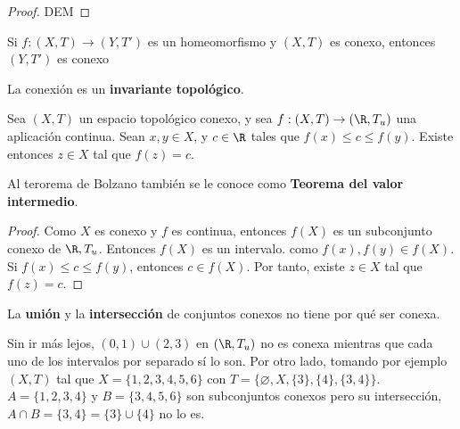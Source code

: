 \begin{proof}
    DEM
\end{proof}

\begin{ncor}
  Si $f:(X,T) \to (Y,T')$ es un homeomorfismo y $(X,T)$ es conexo, entonces $(Y,T')$ es conexo 
\end{ncor}
\begin{obs}
    La conexión es un \textbf{invariante topológico}.
\end{obs}

\begin{nth}[de Bolzano]
  Sea $(X,T)$ un espacio topológico conexo, y sea $f:(X,T) \to (\R,T_u)$ una aplicación continua. Sean $x,y \in X$, y $c \in \R$ tales que $f(x) \leq c \leq f(y)$. Existe entonces $z \in X$ tal que $f(z) = c$.
\end{nth}
\begin{note}
    Al terorema de Bolzano también se le conoce como \textbf{Teorema del valor intermedio}.
\end{note}
\begin{proof}
    Como $X$ es conexo y $f$ es continua, entonces $f(X)$ es un subconjunto conexo de $\R, T_u$. Entonces $f(X)$ es un intervalo. como $f(x), f(y) \in f(X)$. Si $f(x) \leq c \leq f(y)$, entonces $c \in f(X)$. Por tanto, existe $z \in X$ tal que $f(z) = c$.
\end{proof}

\begin{note}
    La \textbf{unión} y la \textbf{intersección} de conjuntos conexos no tiene por qué ser conexa.
\end{note}
\begin{exmp}
    Sin ir más lejos, $(0,1) \cup (2,3)$ en $(\R, T_u)$ no es conexa mientras que cada uno de los intervalos por separado sí lo son. 
    Por otro lado, tomando por ejemplo $(X,T)$ tal que $X = \{1,2,3,4,5,6\}$ con $T = \{\varnothing, X, \{3\}, \{4\}, \{3,4\}\}$. $A = \{1,2,3,4\}$ y $B = \{3,4,5,6\}$ son subconjuntos conexos pero su intersección, $A \cap B = \{3,4\} = \{3\} \cup \{4\}$ no lo es.
\end{exmp}

